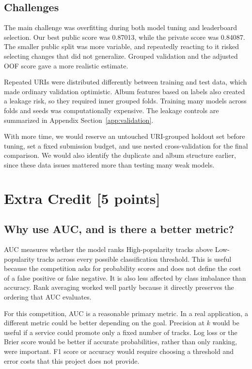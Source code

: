 \documentclass{article}
\begin{document}
\subsection{Challenges}
The main challenge was overfitting during both model tuning and leaderboard
selection. Our best public score was 0.87013, while the private score was
0.84087. The smaller public split was more variable, and repeatedly reacting
to it risked selecting changes that did not generalize. Grouped validation and
the adjusted OOF score gave a more realistic estimate.

Repeated URIs were distributed differently between training and test data,
which made ordinary validation optimistic. Album features based on labels
also created a leakage risk, so they required inner grouped folds. Training
many models across folds and seeds was computationally expensive. The leakage
controls are summarized in Appendix Section~\ref{app:validation}.

With more time, we would reserve an untouched URI-grouped holdout set before
tuning, set a fixed submission budget, and use nested cross-validation for the
final comparison. We would also identify the duplicate and album structure
earlier, since these data issues mattered more than testing many weak models.
\newpage

\section{Extra Credit [5 points]}

\subsection{Why use AUC, and is there a better metric?}
AUC measures whether the model ranks High-popularity tracks above
Low-popularity tracks across every possible classification threshold. This is
useful because the competition asks for probability scores and does not define
the cost of a false positive or false negative. It is also less affected by
class imbalance than accuracy. Rank averaging worked well partly because it
directly preserves the ordering that AUC evaluates.

For this competition, AUC is a reasonable primary metric. In a real
application, a different metric could be better depending on the goal.
Precision at \(k\) would be useful if a service could promote only a fixed
number of tracks. Log loss or the Brier score would be better if accurate
probabilities, rather than only ranking, were important. F1 score or accuracy
would require choosing a threshold and error costs that this project does not
provide.
\end{document}
